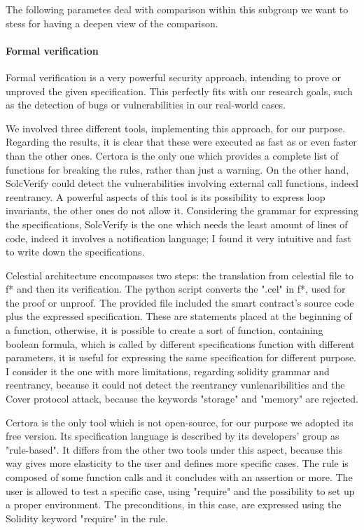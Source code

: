 The following parametes deal with comparison within this subgroup we want to stess for having a deepen view of the comparison.

\paragraph{Formal verification} 
Formal verification is a very powerful security approach, intending to prove or unproved the given specification. 
This perfectly fits with our research goals, such as the detection of bugs or vulnerabilities in our real-world cases. 

We involved three different tools, implementing this approach, for our purpose. Regarding the results, it is clear that these were executed as fast as or even faster than the other ones. 
Certora is the only one which provides a complete list of functions for breaking the rules, rather than just a warning. 
On the other hand, SolcVerify could detect the vulnerabilities involving external call functions, indeed reentrancy. A powerful aspects of this tool is its possibility to express 
loop invariants, the other ones do not allow it.
Considering the grammar for expressing the specifications, SolcVerify is the one which needs the least amount of lines of code, indeed it involves a notification language; 
I found it very intuitive and fast to write down the specifications.

Celestial architecture encompasses two steps: the translation from celestial file to f* and then its verification. The python script converts the ".cel" in f*, used for the proof or unproof.
The provided file included the smart contract's source code plus the expressed specification. These are statements placed at the beginning of a function, otherwise, it is possible to create a sort of function, 
containing boolean formula, which is called by different specifications function with different parameters, it is useful for expressing the same specification for different purpose.  I consider it the one with more limitations, regarding solidity grammar and reentrancy, 
because it could not detect the reentrancy vunlenaribilities and the Cover protocol attack, because the keywords "storage" and "memory" are rejected. 

Certora is the only tool which is not open-source, for our purpose we adopted its free version.
Its specification language is described by its developers' group as "rule-based". It differs from the other two tools under this aspect, because this way gives more elasticity to the user and defines more specific cases.
The rule is composed of some function calls and it concludes with an assertion or more. The user is allowed to test a specific case, using "require" and the possibility to set up a proper environment. 
The preconditions, in this case, are expressed using the Solidity keyword "require" in the rule.

